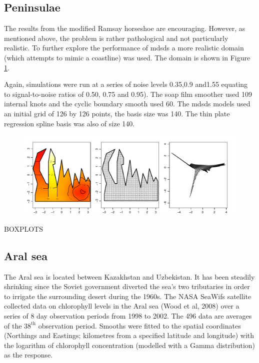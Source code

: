 \documentclass[useAMS,referee]{biom}
\begin{document}
\subsection{Peninsulae}

The results from the modified Ramsay horseshoe are encouraging. However, as mentioned above, the problem is rather pathological and not particularly realistic. To further explore the performance of mdsds a more realistic domain (which attempts to mimic a coastline) was used. The domain is shown in Figure \ref{wt2-plot}.

Again, simulations were run at a series of noise levels 0.35,0.9 and1.55 equating to signal-to-noise ratios of 0.50, 0.75 and 0.95). The soap film smoother used 109 internal knots and the cyclic boundary smooth used 60. The mdsds models used an initial grid of 126 by 126 points, the basis size was 140. The thin plate regression spline basis was also of size 140.

\begin{figure}
\centering
\includegraphics[width=\textwidth]{examples/wt2/wt2-plot.pdf} \\
\caption{}
\label{wt2-plot}
\end{figure}


BOXPLOTS


\subsection{Aral sea}

The Aral sea is located between Kazakhstan and Uzbekistan. It has been steadily shrinking since the Soviet government diverted the sea's two tributaries in order to irrigate the surrounding desert during the 1960s. The NASA SeaWifs satellite collected data on chlorophyll levels in the Aral sea (Wood et al, 2008) over a series of 8 day observation periods from 1998 to 2002. The 496 data are averages of the $38^\text{th}$ observation period. Smooths were fitted to the spatial coordinates (Northings and Eastings; kilometres from a specified latitude and longitude) with the logarithm of chlorophyll concentration (modelled with a Gamma distribution) as the response.
\end{document}
